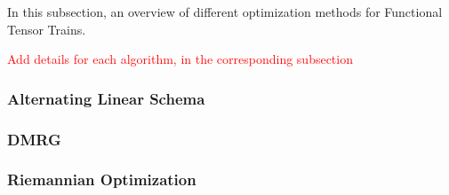 \documentclass[11pt]{article}
\begin{document}
    In this subsection, an overview of different optimization methods for Functional Tensor Trains.

    \textcolor{red}{Add details for each algorithm, in the corresponding subsection}

    \subsubsection{Alternating Linear Schema}

    \subsubsection{DMRG}
    
    \cite{}

    \subsubsection{Riemannian Optimization}
\end{document}
